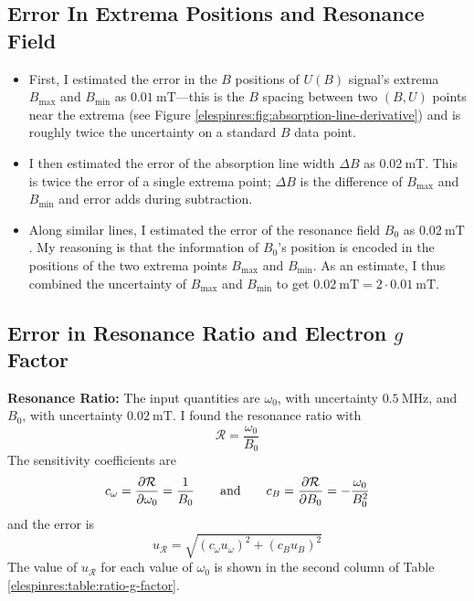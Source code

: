 \documentclass[11pt, a4paper]{article}
\newcommand{\eqtext}[1]{\qquad \text{#1} \qquad}
\begin{document}
\subsection{Error In Extrema Positions and Resonance Field}
\begin{itemize}
	\item First, I estimated the error in the $ B $ positions of $ U(B) $ signal's extrema $ B_{\text{max}} $ and $ B_{\text{min}} $ as $ \SI{0.01}{\milli \tesla} $---this is the $ B $ spacing between two $ (B, U) $ points near the extrema (see Figure \ref{elespinres:fig:absorption-line-derivative}) and is roughly twice the uncertainty on a standard $ B $ data point.
	
	\item I then estimated the error of the absorption line width $ \Delta B $ as $ \SI{0.02}{\milli \tesla} $. This is twice the error of a single extrema point; $ \Delta B $ is the difference of $ B_{\text{max}} $ and $ B_{\text{min}} $ and error adds during subtraction.
	
	\item Along similar lines, I estimated the error of the resonance field $ B_{0} $ as $ \SI{0.02}{\milli \tesla} $. My reasoning is that the information of $ B_{0} $'s position is encoded in the positions of the two extrema points  $ B_{\text{max}} $ and $ B_{\text{min}} $. As an estimate, I thus combined the uncertainty of  $ B_{\text{max}} $ and $ B_{\text{min}} $ to get $ \SI{0.02}{\milli \tesla} = 2 \cdot \SI{0.01}{\milli \tesla} $.
	
\end{itemize}


\subsection{Error in Resonance Ratio and Electron $ g $ Factor}
\textbf{Resonance Ratio:} The input quantities are $ \omega_{0} $, with uncertainty $ \SI{0.5}{\mega \hertz} $, and $ B_{0} $, with uncertainty $ \SI{0.02}{\milli \tesla} $. I found the resonance ratio with
\begin{equation*}
	\mathcal{R} = \frac{\omega_{0}}{B_{0}} 
\end{equation*}
The sensitivity coefficients are
\begin{equation*}
	c_{\omega} = \pdv{\mathcal{R}}{\omega_{0}} = \frac{1}{B_{0}} \eqtext{and} c_{B} = \pdv{\mathcal{R}}{B_{0}} = -\frac{\omega_{0}}{B^{2}_{0}}
\end{equation*}
and the error is
\begin{equation*}
	u_{\mathcal{R}} = \sqrt{(c_{\omega}u_{\omega})^{2} + (c_{B}u_{B})^{2}}
\end{equation*}
The value of $ u_{\mathcal{R}} $ for each value of $ \omega_{0} $ is shown in the second column of Table \ref{elespinres:table:ratio-g-factor}.
\end{document}
